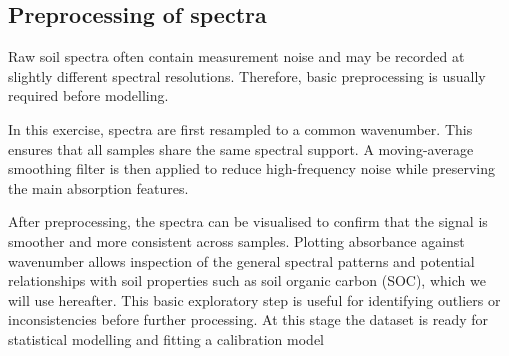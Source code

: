 \documentclass[
  10pt,
  b5paper,
  oneside]{book}
\newenvironment{Shaded}{\begin{snugshade}}{\end{snugshade}}
\newcommand{\CommentTok}[1]{\textcolor[rgb]{0.56,0.35,0.01}{\textit{#1}}}
\newcommand{\ConstantTok}[1]{\textcolor[rgb]{0.56,0.35,0.01}{#1}}
\newcommand{\FunctionTok}[1]{\textcolor[rgb]{0.13,0.29,0.53}{\textbf{#1}}}
\newcommand{\NormalTok}[1]{#1}
\newcommand{\OtherTok}[1]{\textcolor[rgb]{0.56,0.35,0.01}{#1}}
\newcommand{\SpecialCharTok}[1]{\textcolor[rgb]{0.81,0.36,0.00}{\textbf{#1}}}
\begin{document}
\begin{Shaded}
\end{Shaded}

\subsection{Preprocessing of spectra}\label{preprocessing-of-spectra}

Raw soil spectra often contain measurement noise and may be recorded at slightly different spectral resolutions. Therefore, basic preprocessing is usually required before modelling.

In this exercise, spectra are first resampled to a common wavenumber. This ensures that all samples share the same spectral support. A moving-average smoothing filter is then applied to reduce high-frequency noise while preserving the main absorption features.

After preprocessing, the spectra can be visualised to confirm that the signal is smoother and more consistent across samples. Plotting absorbance against wavenumber allows inspection of the general spectral patterns and potential relationships with soil properties such as soil organic carbon (SOC), which we will use hereafter. This basic exploratory step is useful for identifying outliers or inconsistencies before further processing. At this stage the dataset is ready for statistical modelling and fitting a calibration model
\end{document}
